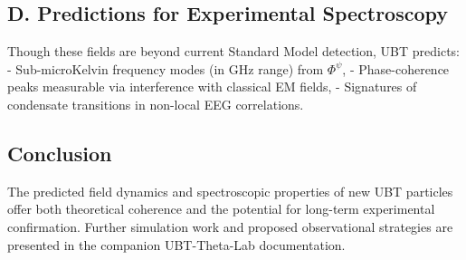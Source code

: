\subsection*{D. Predictions for Experimental Spectroscopy}
Though these fields are beyond current Standard Model detection, UBT predicts:
- Sub-microKelvin frequency modes (in GHz range) from $\Phi^\psi$,
- Phase-coherence peaks measurable via interference with classical EM fields,
- Signatures of condensate transitions in non-local EEG correlations.

\subsection*{Conclusion}
The predicted field dynamics and spectroscopic properties of new UBT particles offer both theoretical coherence and the potential for long-term experimental confirmation. Further simulation work and proposed observational strategies are presented in the companion UBT-Theta-Lab documentation.
